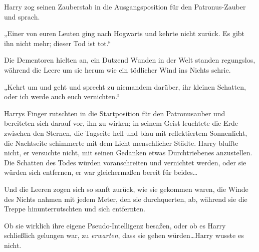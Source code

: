 Harry zog seinen Zauberstab in die Ausgangsposition für den Patronus-Zauber und sprach.

„Einer von euren Leuten ging nach Hogwarts und kehrte nicht zurück. Es gibt ihn nicht mehr; dieser Tod ist tot.“

Die Dementoren hielten an, ein Dutzend Wunden in der Welt standen regungslos, während die Leere um sie herum wie ein tödlicher Wind ins Nichts schrie.

„Kehrt um und geht und sprecht zu niemandem darüber, ihr kleinen Schatten, oder ich werde auch euch vernichten.“

Harrys Finger rutschten in die Startposition für den Patronusauber und bereiteten sich darauf vor, ihn zu wirken; in seinem Geist leuchtete die Erde zwischen den Sternen, die Tagseite hell und blau mit reflektiertem Sonnenlicht, die Nachtseite schimmerte mit dem Licht menschlicher Städte. Harry bluffte nicht, er versuchte nicht, mit seinen Gedanken etwas Durchtriebenes anzustellen. Die Schatten des Todes würden voranschreiten und vernichtet werden, oder sie würden sich entfernen, er war gleichermaßen bereit für beides…

Und die Leeren zogen sich so sanft zurück, wie sie gekommen waren, die Winde des Nichts nahmen mit jedem Meter, den sie durchquerten, ab, während sie die Treppe hinunterrutschten und sich entfernten.

Ob sie wirklich ihre eigene Pseudo-Intelligenz besaßen, oder ob es Harry schließlich gelungen war, zu \emph{erwarten}, dass sie gehen würden…Harry wusste es nicht.

